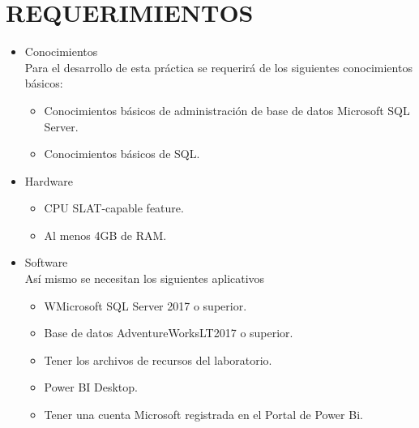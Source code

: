 \documentclass[12pt,letterpaper]{article}
\begin{document}
    \section{REQUERIMIENTOS}
    \begin{itemize}
        \item Conocimientos\\
        Para el desarrollo de esta práctica se requerirá de los siguientes conocimientos básicos:
        \begin{itemize} 
            \item Conocimientos básicos de administración de base de datos Microsoft SQL Server.
            \item Conocimientos básicos de SQL.
        \end{itemize}
        \item Hardware
        \begin{itemize}
            \item CPU SLAT-capable feature.
            \item Al menos 4GB de RAM.
        \end{itemize}
        \item Software\\
        Así mismo se necesitan los siguientes aplicativos
        \begin{itemize}
            \item WMicrosoft SQL Server 2017 o superior.
            \item Base de datos AdventureWorksLT2017 o superior.
            \item Tener los archivos de recursos del laboratorio.
            \item Power BI Desktop.
            \item Tener una cuenta Microsoft registrada en el Portal de Power Bi.
        \end{itemize}
    \end{itemize}
\end{document}
